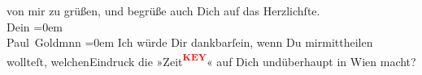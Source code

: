 \begin{ledgroupsized}[t]{13cm}
                    von mir zu grüßen, {\pb} und begrüße auch Dich auf
                    das Herzlichſte. {\\[\baselineskip]}Dein\pend
           \leftskip=0em{}\pstart
           {\\[\baselineskip]}\spacefill\mbox{Paul Goldmnn}\pend
           \leftskip=0em{}\pstart
           Ich würde Dir dankbarſein, wenn Du mirmittheilen wollteſt, welchenEindruck die »Zeit\textcolor{red}{\textsuperscript{\textbf{KEY}}}« auf Dich
                        undüberhaupt in Wien macht?
                    \pend
           
         
         \endnumbering{}\end{ledgroupsized}\begin{anhang}\end{anhang}\newcommand{\dateiname}{L03223}\newcommand{\titel}{Paul Goldmann an Arthur Schnitzler, 2. 9. [1902]}\newcommand{\editorInnen}{Martin Anton Müller und Laura Untner}
      